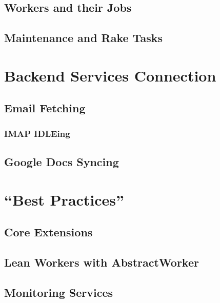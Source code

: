 \subsubsection{}
\subsubsection{}
\subsubsection{}
\subsubsection{}
\subsubsection{}

\subsection{Workers and their Jobs}

\subsection{Maintenance and Rake Tasks}



\section{Backend Services Connection}

\subsection{Email Fetching}

\subsubsection{IMAP IDLEing}

\subsection{Google Docs Syncing}


\section{``Best Practices''}

\subsection{Core Extensions}

\subsection{Lean Workers with AbstractWorker}

\subsection{Monitoring Services}

